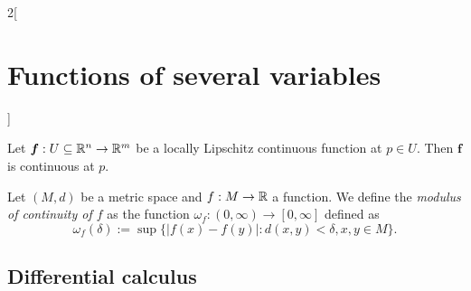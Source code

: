 \documentclass[../../../main.tex]{subfiles}
\begin{document}
\begin{multicols}{2}[\section{Functions of several variables}]
\begin{definition}
\label{FOSV_contr}
\end{definition}
\begin{prop}
Let $\mathbf{\boldsymbol{f}}:U\subseteq\mathbb{R}^n\rightarrow\mathbb{R}^m$ be a locally Lipschitz continuous function at $p\in U$. Then $\mathbf{\boldsymbol{f}}$ is continuous at $p$.
\end{prop}
\begin{definition}
Let $(M,d)$ be a metric space and $f:M\rightarrow\mathbb{R} $ a function. We define the \textit{modulus of continuity of $f$} as the function $\omega_f:(0,\infty)\rightarrow[0,\infty]$ defined as $$\omega_f(\delta):=\sup\{|f(x)-f(y)|:d(x,y)<\delta, x,y\in M\}.$$
\end{definition}
\subsection{Differential calculus}

\end{multicols}
\end{document}

